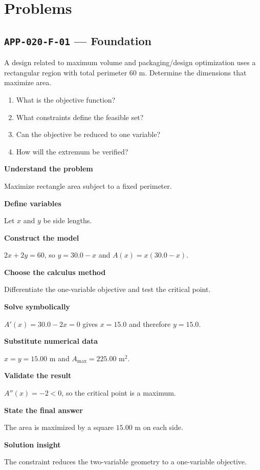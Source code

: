 \documentclass[11pt]{book}
\newcommand{\pid}[1]{\texttt{#1}}
\begin{document}
\section*{Problems}
\subsection*{\pid{APP-020-F-01} — Foundation}
\begin{problembox}
A design related to maximum volume and packaging/design optimization uses a rectangular region with total perimeter 60 m. Determine the dimensions that maximize area.
\end{problembox}
\begin{promptbox}\begin{enumerate}
\item What is the objective function?
\item What constraints define the feasible set?
\item Can the objective be reduced to one variable?
\item How will the extremum be verified?
\end{enumerate}\end{promptbox}
\begin{solutionbox}
\textbf{Understand the problem}\par Maximize rectangle area subject to a fixed perimeter.\par\medskip
\textbf{Define variables}\par Let $x$ and $y$ be side lengths.\par\medskip
\textbf{Construct the model}\par $2x+2y=60$, so $y=30.0-x$ and $A(x)=x(30.0-x)$.\par\medskip
\textbf{Choose the calculus method}\par Differentiate the one-variable objective and test the critical point.\par\medskip
\textbf{Solve symbolically}\par $A'(x)=30.0-2x=0$ gives $x=15.0$ and therefore $y=15.0$.\par\medskip
\textbf{Substitute numerical data}\par $x=y=15.00$ m and $A_{\max}=225.00$ m$^2$.\par\medskip
\textbf{Validate the result}\par $A''(x)=-2<0$, so the critical point is a maximum.\par\medskip
\textbf{State the final answer}\par The area is maximized by a square $15.00$ m on each side.\par\medskip
\textbf{Solution insight}\par The constraint reduces the two-variable geometry to a one-variable objective.\par\medskip
\end{solutionbox}
\end{document}
